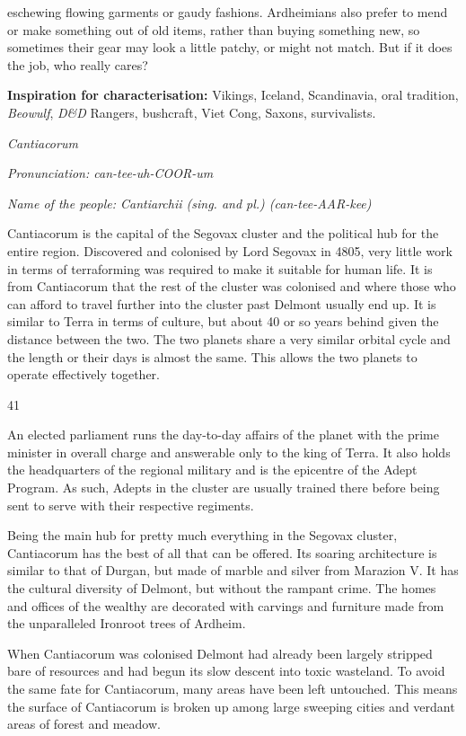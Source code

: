 \documentclass{scrbook}
\begin{document}
eschewing flowing garments or gaudy fashions. Ardheimians also prefer to mend or make something out of old items, rather than buying something new, so sometimes their gear may look a little patchy, or might not match. But if it does the job, who really cares?

\textbf{Inspiration for characterisation:} Vikings, Iceland, Scandinavia, oral tradition, \textit{Beowulf}, \textit{D\&D} Rangers, bushcraft, Viet Cong, Saxons, survivalists.

\textit{Cantiacorum}

\textit{Pronunciation: can-tee-uh-COOR-um}

\textit{Name of the people: Cantiarchii (sing. and pl.) (can-tee-AAR-kee)}

Cantiacorum is the capital of the Segovax cluster and the political hub for the entire region. Discovered and colonised by Lord Segovax in 4805, very little work in terms of terraforming was required to make it suitable for human life. It is from Cantiacorum that the rest of the cluster was colonised and where those who can afford to travel further into the cluster past Delmont usually end up. It is similar to Terra in terms of culture, but about 40 or so years behind given the distance between the two. The two planets share a very similar orbital cycle and the length or their days is almost the same. This allows the two planets to operate effectively together.

41

An elected parliament runs the day-to-day affairs of the planet with the prime minister in overall charge and answerable only to the king of Terra. It also holds the headquarters of the regional military and is the epicentre of the Adept Program. As such, Adepts in the cluster are usually trained there before being sent to serve with their respective regiments.

Being the main hub for pretty much everything in the Segovax cluster, Cantiacorum has the best of all that can be offered. Its soaring architecture is similar to that of Durgan, but made of marble and silver from Marazion V. It has the cultural diversity of Delmont, but without the rampant crime. The homes and offices of the wealthy are decorated with carvings and furniture made from the unparalleled Ironroot trees of Ardheim.

When Cantiacorum was colonised Delmont had already been largely stripped bare of resources and had begun its slow descent into toxic wasteland. To avoid the same fate for Cantiacorum, many areas have been left untouched. This means the surface of Cantiacorum is broken up among large sweeping cities and verdant areas of forest and meadow.
\end{document}
